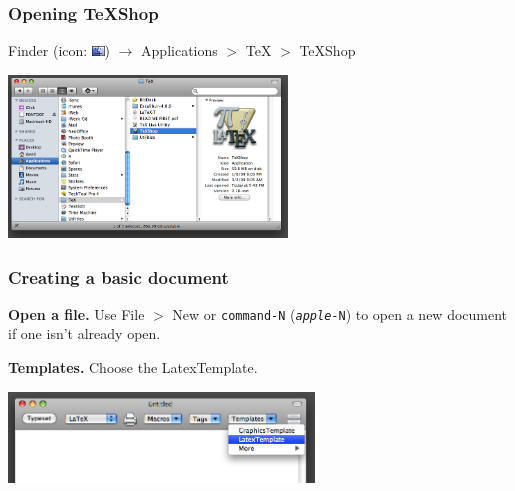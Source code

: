 \documentclass[slidestop,compress,mathserif]{beamer}
\begin{document}
\begin{frame} \frametitle{Opening TeXShop}
{\color{highlight}Finder (icon: \hspace{1mm}\includegraphics[height=0.28cm]{basicsOfLatex/gettingStarted/finder}\hspace{1mm}) $\to$ Applications $>$ TeX $>$ TeXShop} \\
\begin{center}
\includegraphics[height=1.7in]{basicsOfLatex/gettingStarted/openingTexshop}
\end{center}
\end{frame}

\begin{frame} \frametitle{Creating a basic document}
{\bf Open a file. } Use {\color{highlight}File $>$ New} or \texttt{\color{highlight}command-N} (\texttt{\color{highlight}\emph{apple}-N}) to open a new document if one isn't already open. \\
\vspace{0.7cm}

{\bf Templates. } Choose the LatexTemplate.
\begin{center}
\includegraphics[height=0.95in]{basicsOfLatex/gettingStarted/chooseTemplate}
\end{center}
\end{frame}
\end{document}

